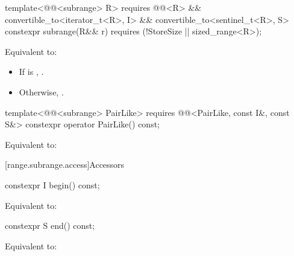 %
\begin{itemdecl}
template<@@<subrange> R>
  requires @@<R> &&
           convertible_to<iterator_t<R>, I> && convertible_to<sentinel_t<R>, S>
constexpr subrange(R&& r) requires (!StoreSize || sized_range<R>);
\end{itemdecl}

\begin{itemdescr}
\pnum
\effects Equivalent to:
\begin{itemize}
\item If  is ,
.
\item Otherwise, .
\end{itemize}
\end{itemdescr}

%
\begin{itemdecl}
template<@@<subrange> PairLike>
  requires @@<PairLike, const I&, const S&>
constexpr operator PairLike() const;
\end{itemdecl}

\begin{itemdescr}
\pnum
\effects Equivalent to: 
\end{itemdescr}

[range.subrange.access]{Accessors}

%
\begin{itemdecl}
constexpr I begin() const;
\end{itemdecl}

\begin{itemdescr}
\pnum
\effects Equivalent to: 
\end{itemdescr}

%
\begin{itemdecl}
constexpr S end() const;
\end{itemdecl}

\begin{itemdescr}
\pnum
\effects Equivalent to: 
\end{itemdescr}

